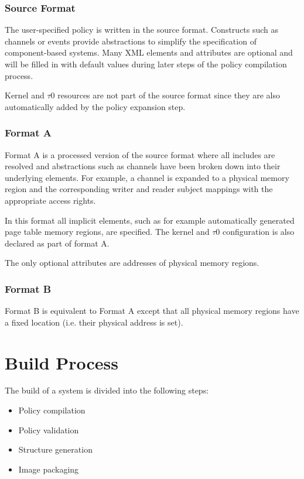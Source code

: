 \documentclass[a4paper,twoside,titlepage]{article}
\begin{document}
\subsubsection{Source Format}
The user-specified policy is written in the source format. Constructs such as
channels or events provide abstractions to simplify the specification of
component-based systems. Many XML elements and attributes are optional and will
be filled in with default values during later steps of the policy compilation
process.

Kernel and $\tau$0 resources are not part of the source format since they are also
automatically added by the policy expansion step.

\subsubsection{Format A}
Format A is a processed version of the source format where all includes are
resolved and abstractions such as channels have been broken down into their
underlying elements. For example, a channel is expanded to a physical memory
region and the corresponding writer and reader subject mappings with the
appropriate access rights.

In this format all implicit elements, such as for example automatically
generated page table memory regions, are specified. The kernel and $\tau$0
configuration is also declared as part of format A.

The only optional attributes are addresses of physical memory regions.

\subsubsection{Format B}
Format B is equivalent to Format A except that all physical memory regions have
a fixed location (i.e. their physical address is set).

\section{Build Process}
The build of a system is divided into the following steps:

\begin{itemize}
	\item Policy compilation
	\item Policy validation
	\item Structure generation
	\item Image packaging
\end{itemize}
\end{document}
